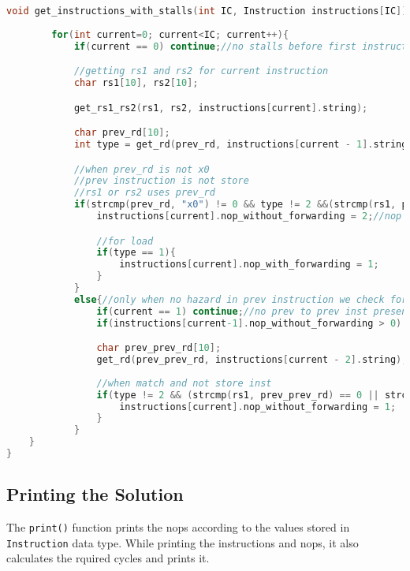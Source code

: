 \documentclass{article}
\begin{document}
\begin{lstlisting}[language=C, caption={get\_instructions\_with\_stalls function}, label={hazard-detection}, backgroundcolor=\color{codebackground}]
    void get_instructions_with_stalls(int IC, Instruction instructions[IC]){
    
        for(int current=0; current<IC; current++){
            if(current == 0) continue;//no stalls before first instruction

            //getting rs1 and rs2 for current instruction
            char rs1[10], rs2[10];

            get_rs1_rs2(rs1, rs2, instructions[current].string);

            char prev_rd[10];
            int type = get_rd(prev_rd, instructions[current - 1].string);

            //when prev_rd is not x0
            //prev instruction is not store
            //rs1 or rs2 uses prev_rd
            if(strcmp(prev_rd, "x0") != 0 && type != 2 &&(strcmp(rs1, prev_rd) == 0 || strcmp(rs2, prev_rd) == 0) ){
                instructions[current].nop_without_forwarding = 2;//nop for prev instruction withoud forwarding

                //for load
                if(type == 1){
                    instructions[current].nop_with_forwarding = 1;
                }
            }
            else{//only when no hazard in prev instruction we check for prev to prev
                if(current == 1) continue;//no prev to prev inst present in this case
                if(instructions[current-1].nop_without_forwarding > 0) continue;//more than equal to 2 inst gap already

                char prev_prev_rd[10];
                get_rd(prev_prev_rd, instructions[current - 2].string);
                
                //when match and not store inst
                if(type != 2 && (strcmp(rs1, prev_prev_rd) == 0 || strcmp(rs2, prev_prev_rd) == 0) ){
                    instructions[current].nop_without_forwarding = 1;
                }
            }
    }
}

\end{lstlisting}

\subsection{Printing the Solution}
The \texttt{print()} function prints the nops according to the values stored in \texttt{Instruction} data type. While printing the instructions and nops, it also calculates the rquired cycles and prints it.
\end{document}
